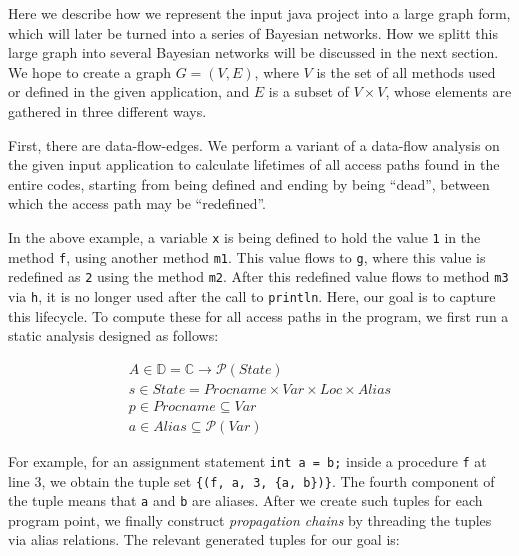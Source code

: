 \documentclass[sigconf,review,anonymous]{acmart}\settopmatter{printfolios=true,printccs=false,printacmref=false}
\begin{document}
Here we describe how we represent the input java project into a large graph form, which will
later be turned into a series of Bayesian networks. How we splitt this large
graph into several Bayesian networks will be discussed in the next section. %
We hope to create a graph $G=(V, E)$,
where $V$ is the set of all methods used or defined in the given application, and $E$ is a
subset of $V\times V$, whose elements are gathered in three different ways. 

First, there are data-flow-edges. We perform a variant of a data-flow analysis on the
given input application to calculate lifetimes of all access paths found in the
entire codes, starting from being defined and ending by being ``dead'', between
which the access path may be ``redefined''.



In the above example, a variable \texttt{x} is being defined to hold the value \texttt{1} in the method
\texttt{f}, using another method \texttt{m1}. This value flows to \texttt{g}, where this
value is redefined as \texttt{2} using the method \texttt{m2}. After this redefined
value flows to method \texttt{m3} via \texttt{h}, it is no longer used after the call to
\texttt{println}. Here, our goal is to capture this lifecycle. To compute these
for all access paths in the program, we first run a static analysis designed as follows:


\begin{align*}
  A\in \mathbb{D} = \mathbb{C}\rightarrow\mathcal{P}(State)\\
  s\in State = Procname\times Var\times Loc\times Alias\\
  p\in Procname \subseteq Var\\
  a\in Alias \subseteq \mathcal{P}(Var)
\end{align*}

For example, for an assignment statement \texttt{int a = b;} inside a procedure
\texttt{f} at line 3, we obtain the tuple set \texttt{\{(f, a, 3, \{a, b\})\}}.
The fourth component of the tuple means that \texttt{a} and \texttt{b} are
aliases. After we create such tuples for each program point, we finally construct
\emph{propagation chains} by threading the tuples via alias relations. The
relevant generated tuples for our goal is:
\end{document}
